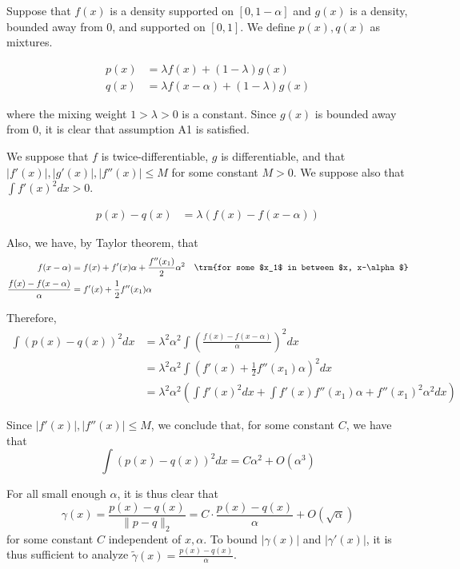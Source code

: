 \documentclass{article}
\begin{document}
\begin{example}

Suppose that $f(x)$ is a density supported on $[0, 1-\alpha]$ and $g(x)$ is a density, bounded away from 0, and supported on $[0,1]$. We define $p(x), q(x)$ as mixtures.

\begin{align*}
p(x) &= \lambda f(x) + (1-\lambda) g(x)\\
q(x) &= \lambda f(x - \alpha) + (1-\lambda) g(x)
\end{align*}

where the mixing weight $1 > \lambda > 0$ is a constant. Since $g(x)$ is bounded away from 0, it is clear that assumption A1 is satisfied. 

We suppose that $f$ is twice-differentiable, $g$ is differentiable, and that $|f'(x)|, |g'(x)|, |f''(x)| \leq M$ for some constant $M > 0$. We suppose also that $\int f'(x)^2 dx > 0$.

\begin{align*}
p(x) - q(x) &= \lambda (f(x) - f(x-\alpha)) 
\end{align*}

Also, we have, by Taylor theorem, that
\begin{align*}
f(x - \alpha) &= f(x) + f'(x) \alpha + \frac{f''(x_1)}{2} \alpha^2 \quad \trm{for some $x_1$ in between $x, x-\alpha$} \\
\frac{f(x) - f(x-\alpha)}{\alpha} &= f'(x) + \frac{1}{2} f''(x_1) \alpha
\end{align*}

Therefore,
\begin{align*}
\int (p(x) - q(x))^2 dx &= \lambda^2 \alpha^2 \int 
   \left( \frac{f(x) - f(x - \alpha)}{\alpha} \right)^2 dx \\
  &= \lambda^2 \alpha^2 \int (f'(x) + \frac{1}{2} f''(x_1) \alpha)^2 dx \\
 &= \lambda^2 \alpha^2 \left( \int f'(x)^2 dx  + \int f'(x) f''(x_1) \alpha + f''(x_1)^2 \alpha^2 dx \right) 
\end{align*}

Since $|f'(x)|, |f''(x)| \leq M$, we conclude that, for some constant $C$, we have that
\[
\int (p(x) - q(x))^2 dx = C \alpha^2 + O(\alpha^3) 
\]

For all small enough $\alpha$, it is thus clear that
\[
\gamma(x) = \frac{p(x) - q(x)}{\| p - q \|_2} = C \cdot \frac{p(x) - q(x)}{\alpha} + O(\sqrt{\alpha})
\]
for some constant $C$ independent of $x, \alpha$. To bound $|\gamma(x)|$ and $|\gamma'(x)|$, it is thus sufficient to analyze $\tilde{\gamma}(x) = \frac{p(x) - q(x)}{\alpha}$. 


\end{example}
\end{document}
